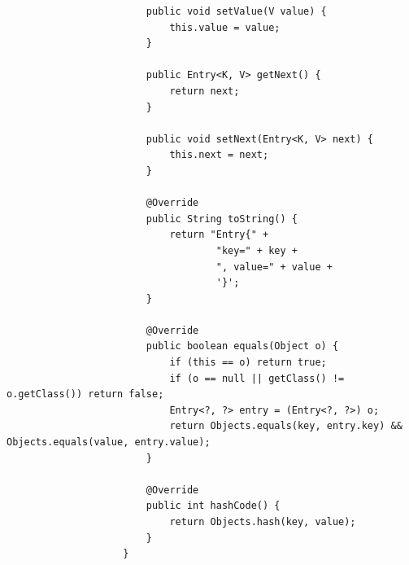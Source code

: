 \documentclass[a4paper, landscape, 8pt]{scrartcl}
\begin{document}
\begin{multicols*}{4}
\begin{lstlisting}
                        public void setValue(V value) {
                            this.value = value;
                        }

                        public Entry<K, V> getNext() {
                            return next;
                        }

                        public void setNext(Entry<K, V> next) {
                            this.next = next;
                        }

                        @Override
                        public String toString() {
                            return "Entry{" +
                                    "key=" + key +
                                    ", value=" + value +
                                    '}';
                        }

                        @Override
                        public boolean equals(Object o) {
                            if (this == o) return true;
                            if (o == null || getClass() != o.getClass()) return false;
                            Entry<?, ?> entry = (Entry<?, ?>) o;
                            return Objects.equals(key, entry.key) && Objects.equals(value, entry.value);
                        }

                        @Override
                        public int hashCode() {
                            return Objects.hash(key, value);
                        }
                    }
                    \end{lstlisting}

    \end{multicols*}
\end{document}
